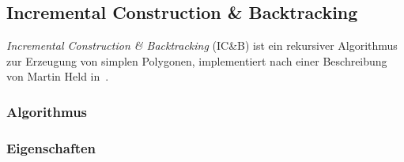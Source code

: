 \subsection{Incremental Construction \& Backtracking}
\emph{Incremental Construction \& Backtracking} (IC\&B) ist ein rekursiver Algorithmus zur Erzeugung von simplen Polygonen, implementiert nach einer Beschreibung von Martin Held in~\cite{held98polygons}. 
\subsubsection{Algorithmus}


\subsubsection{Eigenschaften}
